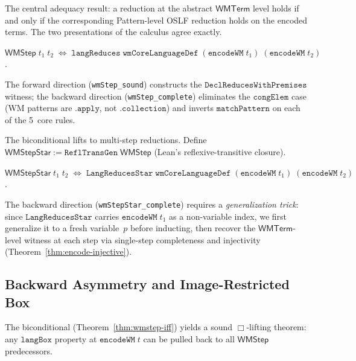 \documentclass[11pt,openany]{report}
\begin{document}
The central adequacy result: a reduction at the abstract $\mathsf{WMTerm}$
level holds if and only if the corresponding Pattern-level OSLF reduction
holds on the encoded terms.  The two presentations of the calculus agree
exactly.

\begin{theorem}
\label{thm:wmstep-iff}
$\mathsf{WMStep}\;t_1\;t_2 \;\Leftrightarrow\;
\mathtt{langReduces}\;\mathtt{wmCoreLanguageDef}\;
(\mathtt{encodeWM}\;t_1)\;(\mathtt{encodeWM}\;t_2)$.
\end{theorem}

\noindent
The forward direction (\texttt{wmStep\_sound}) constructs the
$\mathtt{DeclReducesWithPremises}$ witness; the backward direction
(\texttt{wmStep\_complete}) eliminates the $\mathtt{congElem}$ case
(WM patterns are $\mathtt{.apply}$, not $\mathtt{.collection}$) and
inverts $\mathtt{matchPattern}$ on each of the 5~core rules.

The biconditional lifts to multi-step reductions.
Define $\mathsf{WMStepStar} := \mathtt{ReflTransGen}\;\mathsf{WMStep}$
(Lean's reflexive-transitive closure).

\begin{theorem}
\label{thm:star-adequate}
$\mathsf{WMStepStar}\;t_1\;t_2 \;\Leftrightarrow\;
\mathtt{LangReducesStar}\;\mathtt{wmCoreLanguageDef}\;
(\mathtt{encodeWM}\;t_1)\;(\mathtt{encodeWM}\;t_2)$.
\end{theorem}

\noindent
The backward direction (\texttt{wmStepStar\_complete}) requires a
\emph{generalization trick}: since $\mathtt{LangReducesStar}$ carries
$\mathtt{encodeWM}\;t_1$ as a non-variable index, we first generalize
it to a fresh variable~$p$ before inducting, then recover the
$\mathsf{WMTerm}$-level witness at each step via single-step
completeness and injectivity (Theorem~\ref{thm:encode-injective}).

\subsection{Backward Asymmetry and Image-Restricted Box}
\label{sec:wm-backward-asymmetry}
\label{sec:wm-image-box}

The biconditional (Theorem~\ref{thm:wmstep-iff}) yields a sound
$\Box$-lifting theorem: any $\mathtt{langBox}$ property at
$\mathtt{encodeWM}\;t$ can be pulled back to all $\mathsf{WMStep}$
predecessors.
\end{document}
